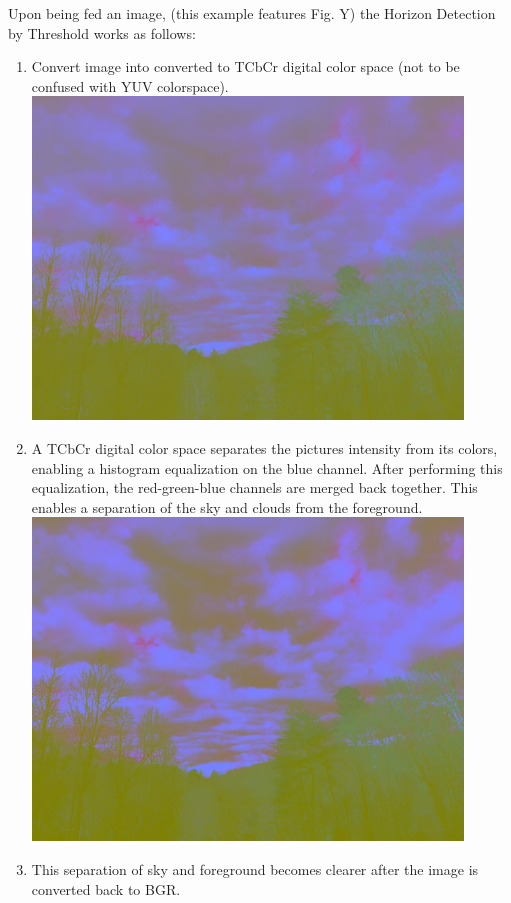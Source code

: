 \documentclass[onecolumn, draftclsnofoot,10pt, compsoc]{IEEEtran}
\begin{document}
\begin{singlespace}
					Upon being fed an image, (this example features Fig. Y) the Horizon Detection by Threshold works as follows:
					\begin{enumerate}
						\item Convert image into converted to TCbCr digital color space (not to be confused with YUV colorspace).\\
							\includegraphics[width=4.5in,natwidth=640,natheight=480]{images/threshold/1.jpg}
						\item A TCbCr digital color space separates the pictures intensity from its colors, enabling a histogram equalization on the blue channel. After performing this equalization, the red-green-blue channels are merged back together. This enables a separation of the sky and clouds from the foreground.\\
							\includegraphics[width=4.5in,natwidth=640,natheight=480]{images/threshold/2.jpg}
						\item This separation of sky and foreground becomes clearer after the image is converted back to BGR.\\

\end{enumerate}
\end{singlespace}
\end{document}
